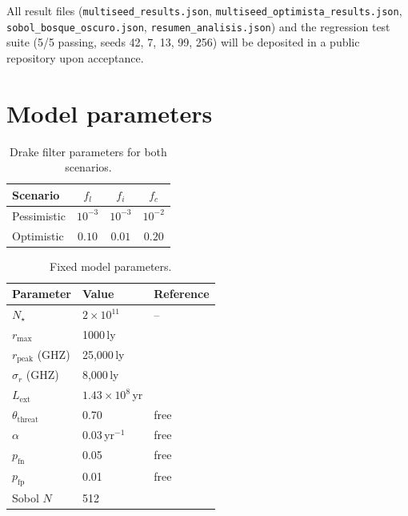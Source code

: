 \documentclass[useAMS,usenatbib]{mn2e}
\begin{document}
All result files (\texttt{multiseed\_results.json},
\texttt{multiseed\_optimista\_results.json},
\texttt{sobol\_bosque\_oscuro.json},
\texttt{resumen\_analisis.json}) and the regression test suite
(5/5 passing, seeds 42, 7, 13, 99, 256) will be deposited
in a public repository upon acceptance.

\appendix
\section{Model parameters}
\label{app:params}

\begin{table}
  \centering
  \caption{Drake filter parameters for both scenarios.}
  \label{tab:scenarios}
  \begin{tabular}{lccc}
    \toprule
    Scenario & $f_l$ & $f_i$ & $f_c$ \\
    \midrule
    Pessimistic & $10^{-3}$ & $10^{-3}$ & $10^{-2}$ \\
    Optimistic  & $0.10$    & $0.01$    & $0.20$    \\
    \bottomrule
  \end{tabular}
\end{table}

\begin{table}
  \centering
  \caption{Fixed model parameters.}
  \label{tab:params}
  \begin{tabular}{lll}
    \toprule
    Parameter & Value & Reference \\
    \midrule
    $N_\star$ & $2\times10^{11}$ & -- \\
    $r_\text{max}$ & 1000\,ly & \citet{troitskij1989,loeb2007} \\
    $r_\text{peak}$ (GHZ) & 25{,}000\,ly & \citet{lineweaver2004} \\
    $\sigma_r$ (GHZ) & 8{,}000\,ly & \citet{lineweaver2004} \\
    $L_\text{ext}$ & $1.43\times10^8$\,yr & \citet{sandberg2018} \\
    $\theta_\text{threat}$ & 0.70 & free \\
    $\alpha$ & 0.03\,yr$^{-1}$ & free \\
    $p_\text{fn}$ & 0.05 & free \\
    $p_\text{fp}$ & 0.01 & free \\
    Sobol $N$ & 512 & \citet{saltelli2010} \\
    \bottomrule
  \end{tabular}
\end{table}
\end{document}
